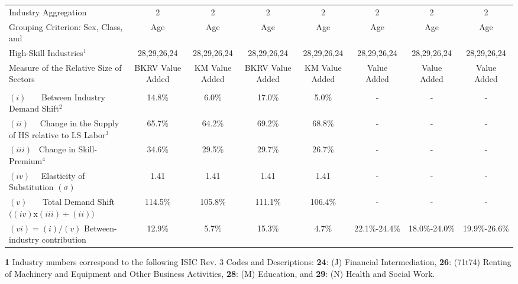 \documentclass[10pt]{article}
\begin{document}
\begin{landscape}
\begin{table}[h!]
\begin{threepartable}
{\begin{tabular}{l| c c c c | c c c}
Industry Aggregation                             						& 2              & 2             & 2             & 2             & 2             & 2             & 2           \\
Grouping Criterion: Sex, Class, and         						    & Age            & Age           & Age           & Age           & Age           & Age           & Age         \\
High-Skill Industries$^{1}$                               				& 28,29,26,24    & 28,29,26,24   & 28,29,26,24   & 28,29,26,24   & 28,29,26,24   & 28,29,26,24   & 28,29,26,24 \\
Measure of the Relative Size of Sectors                                 & BKRV Value Added & KM Value Added & BKRV Value Added & KM Value Added & Value Added & Value Added  & Value Added \\\hline
                                                                        &                &               &               &               &               &               &          \\ \hline
$(i)$ \ \ \ Between Industry Demand Shift$^{2}$                         & 14.8\%         & 6.0\%         & 17.0\%        & 5.0\%         & -             & -             & -        \\
$(ii)$ \ \  Change in the Supply of HS relative to LS Labor$^{3}$       & 65.7\%         & 64.2\%        & 69.2\%        & 68.8\%        & -             & -             & -        \\
$(iii)$ \   Change in Skill-Premium$^{4}$                               & 34.6\%         & 29.5\%        & 29.7\%        & 26.7\%        & -             & -             & -        \\
$(iv)$  \ \ Elasticity of Substitution $(\sigma)$                       & 1.41           & 1.41          & 1.41          & 1.41          & -             & -             & -        \\ 
$(v)$ \ \ \ Total Demand Shift $\big( (iv) \text{x} (iii) + (ii) \big)$ & 114.5\%        & 105.8\%       & 111.1\%       & 106.4\%       & -             & -             & -        \\\hline
$(vi) = (i)/(v)$ Between-industry contribution                          & 12.9\%         & 5.7\%         & 15.3\%        & 4.7\%         & 22.1\%-24.4\% & 18.0\%-24.0\% & 19.9\%-26.6\% \\\hline \hline
\end{tabular}
}
\begin{tablenotes} \scriptsize
\item{\textbf{1}}  Industry numbers correspond to the following ISIC Rev. 3 Codes and Descriptions: \textbf{24}: (J) Financial Intermediation, \textbf{26}: (71t74) Renting of Machinery and Equipment and Other Business Activities, \textbf{28}: (M) Education, and \textbf{29}: (N) Health and Social Work.\\

\end{tablenotes}
\end{threepartable}
\end{table}
\end{landscape}
\end{document}
